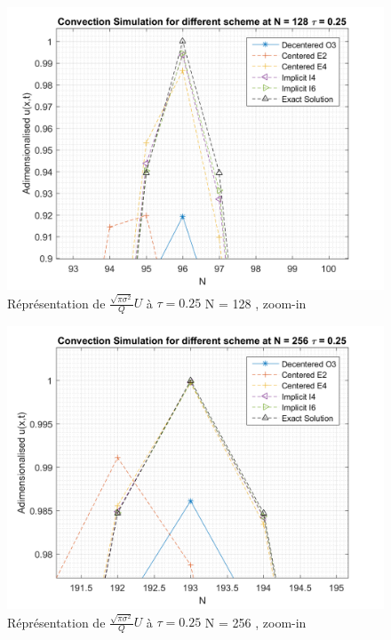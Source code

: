 \documentclass{article}
\begin{document}
\begin{figure}[H]
    \centering
    \includegraphics[scale=0.45]{img/fig3ba.png}
    \caption{Réprésentation de $\frac{\sqrt{\pi \sigma^2}}{Q} U$ à $\tau = 0.25$ N = 128 , zoom-in}
    \label{fig3ba}
\end{figure}
\begin{figure}[H]
    \centering
    \includegraphics[scale=0.45]{img/fig3ca.png}
    \caption{Réprésentation de $\frac{\sqrt{\pi \sigma^2}}{Q} U$ à $\tau = 0.25$ N = 256 , zoom-in}
    \label{fig3ca}
\end{figure}


\newpage
\end{document}
